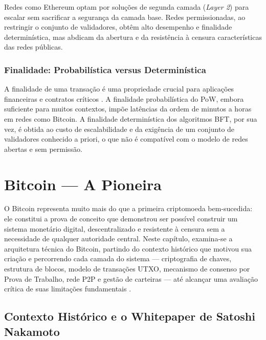 \documentclass[12pt,a4paper]{report}
\begin{document}
Redes como Ethereum optam por soluções de segunda camada (\textit{Layer 2}) para escalar sem sacrificar a segurança da camada base. Redes permissionadas, ao restringir o conjunto de validadores, obtêm alto desempenho e finalidade determinística, mas abdicam da abertura e da resistência à censura características das redes públicas.

\subsection{Finalidade: Probabilística versus Determinística}

A finalidade de uma transação é uma propriedade crucial para aplicações financeiras e contratos críticos \cite{Bashir2023}. A finalidade probabilística do PoW, embora suficiente para muitos contextos, impõe latências da ordem de minutos a horas em redes como Bitcoin. A finalidade determinística dos algoritmos BFT, por sua vez, é obtida ao custo de escalabilidade e da exigência de um conjunto de validadores conhecido a priori, o que não é compatível com o modelo de redes abertas e sem permissão.

\chapter{Bitcoin --- A Pioneira}

O Bitcoin representa muito mais do que a primeira criptomoeda bem-sucedida: ele constitui a prova de conceito que demonstrou ser possível construir um sistema monetário digital, descentralizado e resistente à censura sem a necessidade de qualquer autoridade central. Neste capítulo, examina-se a arquitetura técnica do Bitcoin, partindo do contexto histórico que motivou sua criação e percorrendo cada camada do sistema --- criptografia de chaves, estrutura de blocos, modelo de transações UTXO, mecanismo de consenso por Prova de Trabalho, rede P2P e gestão de carteiras --- até alcançar uma avaliação crítica de suas limitações fundamentais \cite{Bashir2023}.

\section{Contexto Histórico e o Whitepaper de Satoshi Nakamoto}
\end{document}
